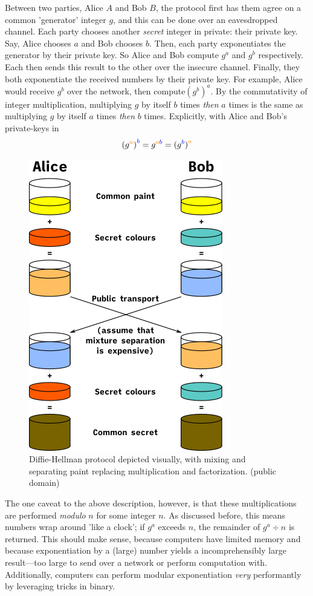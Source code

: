 \documentclass[11pt, a4paper]{report}
\begin{document}
Between two parties, Alice $A$ and Bob $B$, the protocol first has them agree on a common 'generator' integer $g$, and this can be done over an eavesdropped channel. Each party chooses another \textit{secret} integer in private: their private key. Say, Alice chooses $a$ and Bob chooses $b$. Then, each party exponentiates the generator by their private key. So Alice and Bob compute $g^a$ and $g^b$ respectively. Each then sends this result to the other over the insecure channel. Finally, they both exponentiate the received numbers by their private key. For example, Alice would receive $g^b$ over the network, then compute$(g^b)^a$.
By the commutativity of integer multiplication, multiplying $g$ by itself $b$ times \textit{then} $a$ times is the same as  multiplying $g$ by itself $a$ times \textit{then} $b$ times. Explicitly, with Alice and Bob's private-keys in \color{orange}{amber} \color{black}{and} \color{blue}{blue} \color{black}{respectively:}
\[ (g^{\color{orange}{a}}\color{black}{)}^{\color{blue}{b}} = g^{\color{orange}{a}\color{blue}{b}} = (g^{\color{blue}{b}}\color{black}{)}^{\color{orange}{a}}  \]

\begin{figure}[ht]
\begin{center}
\includegraphics[width = .4\linewidth]{colors} 
\caption{Diffie-Hellman protocol depicted visually, with mixing and separating paint replacing multiplication and factorization. (public domain)}
\end{center}
\end{figure}

The one caveat to the above description, however, is that these multiplications are performed \textit{modulo} $n$ for some integer $n$. As discussed before, this means numbers wrap around 'like a clock'; if $g^a$ exceeds $n$, the remainder of $g^a \div n$ is returned. This should make sense, because computers have limited memory and because exponentiation by a (large) number yields a incomprehensibly large result—too large to send over a network or perform computation with. Additionally, computers can perform modular exponentiation \textit{very} performantly by leveraging tricks in binary.\autocite{bunimov}
\end{document}
